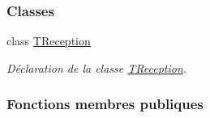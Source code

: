 \subsubsection*{Classes}
\begin{DoxyCompactItemize}
\item 
class \hyperlink{classcom_1_1lasalle_1_1io__trucks_1_1_peripherique_1_1_t_reception}{T\+Reception}
\begin{DoxyCompactList}\small\item\em Déclaration de la classe \hyperlink{classcom_1_1lasalle_1_1io__trucks_1_1_peripherique_1_1_t_reception}{T\+Reception}. \end{DoxyCompactList}\end{DoxyCompactItemize}
\subsubsection*{Fonctions membres publiques}
